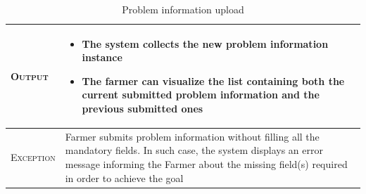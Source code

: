 \begin{table}[H]
\begin{tabular}{|l|p{}|}
    	\textsc{Output}             &  \begin{itemize}
    	    \item The system collects the new problem information instance
    	    \item The farmer can visualize the list containing both the current submitted problem information and the previous submitted ones
    	\end{itemize}\\
    	\hline %
    	\textsc{Exception}         &   Farmer submits problem information without filling all the mandatory fields. In such case, the system displays an error message informing the Farmer about the missing field(s) required in order to achieve the goal\\
    	\hline %
        
    \end{tabular}

\caption{\label{tab:problem_information}Problem information upload}
\end{table}



